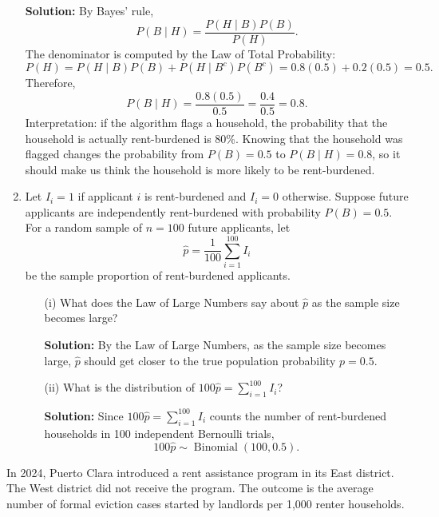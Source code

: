 \documentclass[11pt]{exam}
\begin{document}
\begin{questions}
\begin{enumerate}[leftmargin = 0.5cm, label = (\alph*), rightmargin = 0.2cm]
\begin{solutionorbox}[4cm]
    \end{solutionorbox}
    \begin{solutionorbox}[6cm]
    \textbf{Solution:} By Bayes' rule,
    \[
    P(B\mid H)=\frac{P(H\mid B)P(B)}{P(H)}.
    \]
    The denominator is computed by the Law of Total Probability:
    \[
    P(H)=P(H\mid B)P(B)+P(H\mid B^c)P(B^c)
    =0.8(0.5)+0.2(0.5)=0.5.
    \]
    Therefore,
    \[
    P(B\mid H)=\frac{0.8(0.5)}{0.5}=\frac{0.4}{0.5}=0.8.
    \]
    Interpretation: if the algorithm flags a household, the probability that the household is actually rent-burdened is 80\%. Knowing that the household was flagged changes the probability from $P(B)=0.5$ to $P(B\mid H)=0.8$, so it should make us think the household is more likely to be rent-burdened.
    \end{solutionorbox}

    \item Let $I_i=1$ if applicant $i$ is rent-burdened and $I_i=0$ otherwise. Suppose future applicants are independently rent-burdened with probability $P(B)=0.5$. For a random sample of $n=100$ future applicants, let
    \[
    \widehat p=\frac{1}{100}\sum_{i=1}^{100} I_i
    \]
    be the sample proportion of rent-burdened applicants.
    \begin{itemize}
        \item[(i)] What does the Law of Large Numbers say about $\widehat p$ as the sample size becomes large?
        \begin{solutionorbox}[4.5cm]
        \textbf{Solution:} By the Law of Large Numbers, as the sample size becomes large, $\widehat p$ should get closer to the true population probability $p=0.5$.
        \end{solutionorbox}

        \item[(ii)] What is the distribution of $100\widehat p = \sum_{i=1}^{100} I_i$?
        \begin{solutionorbox}[3cm]
        \textbf{Solution:} Since $100\widehat p=\sum_{i=1}^{100}I_i$ counts the number of rent-burdened households in 100 independent Bernoulli trials,
        \[
        100\widehat p\sim \operatorname{Binomial}(100,0.5).
        \]
        \end{solutionorbox}
    \end{itemize}
\end{enumerate}

\newpage
\question[2.5]
In 2024, Puerto Clara introduced a rent assistance program in its East district. The West district did not receive the program. The outcome is the average number of formal eviction cases started by landlords per 1,000 renter households.


\end{questions}
\end{document}
